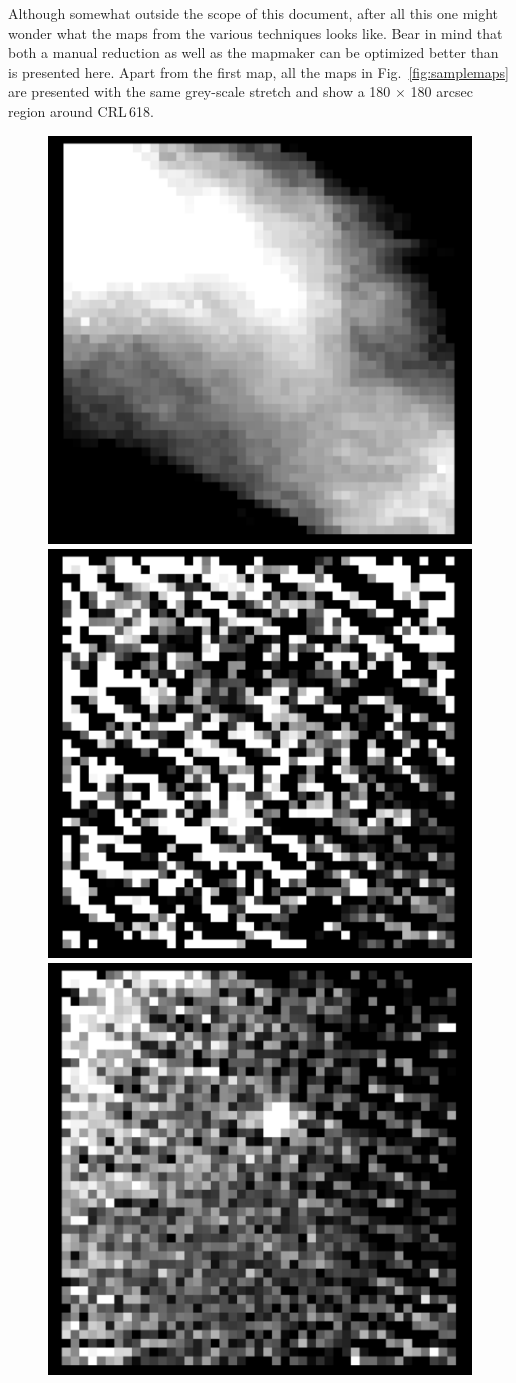\documentclass[twoside,11pt]{starlink}
\begin{document}
Although somewhat outside the scope of this document, after all this
one might wonder what the maps from the various techniques looks like.
Bear in mind that both a manual reduction as well as the mapmaker can
be optimized better than is presented here. Apart from the first map,
all the maps in Fig.\ \ref{fig:samplemaps} are presented with the same
grey-scale stretch and show a 180 $\times$ 180 arcsec region around
CRL\,618.

\begin{figure}[ht]
\begin{center}
\includegraphics[width=0.45\linewidth]{sc19_con_smallmap}
\hspace{0.03\linewidth}
\includegraphics[width=0.45\linewidth]{sc19_conbsl_smallmap}
\includegraphics[width=0.45\linewidth]{sc19_concln_smallmap}
\hspace{0.03\linewidth}

\end{center}
\end{figure}
\end{document}
